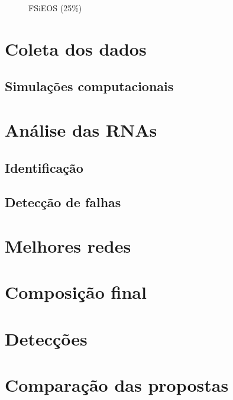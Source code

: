 \begin{figure}[htb]
\footnotesize
\centering

\vspace{1cm}
\caption{FSiEOS (25\%)}
\label{fig:fsieos}
\end{figure}
\section{Coleta dos dados}

\subsection{Simulações computacionais}


\section{Análise das RNAs}

\subsection{Identificação}

\subsection{Detecção de falhas}

\section{Melhores redes}

\section{Composição final}

\section{Detecções}

\section{Comparação das propostas}
